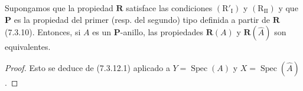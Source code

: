 \begin{proposition}[7.3.17]
\label{IV.2.s7.3.17-fr}
Supongamos que la propiedad $\boldsymbol R$ satisface las condiciones
$(\mathrm R'_{\mathrm I})$ y $(\mathrm R_{\mathrm{II}})$ y que
$\boldsymbol P$ es la propiedad del primer \textup{(resp.} del segundo) tipo
definida a partir de $\boldsymbol R$ \textup{(7.3.10)}. Entonces, si $A$ es un
$\boldsymbol P$-anillo, las propiedades $\boldsymbol R(A)$ y
$\boldsymbol R(\widehat A)$ son equivalentes.
\end{proposition}

\begin{proof}
Esto se deduce de (7.3.12.1) aplicado a
$Y=\operatorname{Spec}(A)$ y $X=\operatorname{Spec}(\widehat A)$.
\end{proof}

